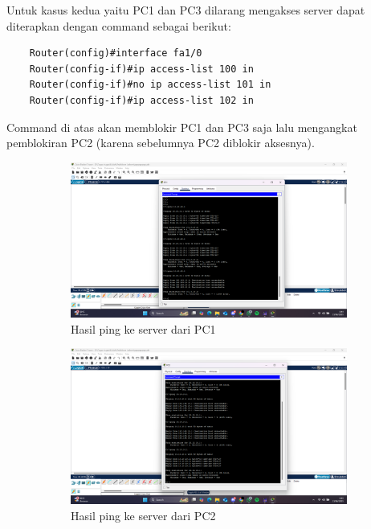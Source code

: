 Untuk kasus kedua yaitu PC1 dan PC3 dilarang mengakses server dapat diterapkan dengan command sebagai berikut:
\begin{lstlisting}
	Router(config)#interface fa1/0
	Router(config-if)#ip access-list 100 in
	Router(config-if)#no ip access-list 101 in
	Router(config-if)#ip access-list 102 in
\end{lstlisting}
Command di atas akan memblokir PC1 dan PC3 saja lalu mengangkat pemblokiran PC2 (karena sebelumnya PC2 diblokir aksesnya). 
\begin{figure}[H]
	\centering
	\begin{subfigure}[b]{0.4\linewidth}
		\centering
		\includegraphics[width=\linewidth]{P4/img/tumod (11).png}
		\caption{Hasil ping ke server dari PC1\label{fig:konfigurasiR1}}
	\end{subfigure}
	\begin{subfigure}[b]{0.4\linewidth}
		\centering
		\includegraphics[width=\linewidth]{P4/img/tumod (13).png}
		\caption{Hasil ping ke server dari PC2\label{fig:konfigurasiR2}}
	\end{subfigure}
	\begin{subfigure}[b]{0.4\linewidth}

\end{subfigure}
\end{figure}

